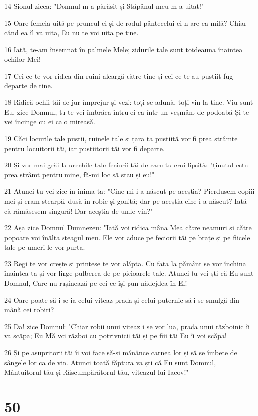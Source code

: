 \par 14 Sionul zicea: "Domnul m-a părăsit și Stăpânul meu m-a uitat!"
\par 15 Oare femeia uită pe pruncul ei și de rodul pântecelui ei n-are ea milă? Chiar când ea îl va uita, Eu nu te voi uita pe tine.
\par 16 Iată, te-am însemnat în palmele Mele; zidurile tale sunt totdeauna înaintea ochilor Mei!
\par 17 Cei ce te vor ridica din ruini aleargă către tine și cei ce te-au pustiit fug departe de tine.
\par 18 Ridică ochii tăi de jur împrejur și vezi: toți se adună, toți vin la tine. Viu sunt Eu, zice Domnul, tu te vei îmbrăca întru ei ca într-un veșmânt de podoabă Și te vei încinge cu ei ca o mireasă.
\par 19 Căci locurile tale pustii, ruinele tale și țara ta pustiită vor fi prea strâmte pentru locuitorii tăi, iar pustiitorii tăi vor fi departe.
\par 20 Și vor mai grăi la urechile tale feciorii tăi de care tu erai lipsită: "ținutul este prea strâmt pentru mine, fă-mi loc să stau și eu!"
\par 21 Atunci tu vei zice în inima ta: "Cine mi i-a născut pe aceștia? Pierdusem copiii mei și eram stearpă, dusă în robie și gonită; dar pe aceștia cine i-a născut? Iată că rămăsesem singură! Dar aceștia de unde vin?"
\par 22 Așa zice Domnul Dumnezeu: "Iată voi ridica mâna Mea către neamuri și către popoare voi înălța steagul meu. Ele vor aduce pe feciorii tăi pe brațe și pe fiicele tale pe umeri le vor purta.
\par 23 Regi te vor crește și prințese te vor alăpta. Cu fața la pământ se vor închina înaintea ta și vor linge pulberea de pe picioarele tale. Atunci tu vei ști că Eu sunt Domnul, Care nu rușinează pe cei ce își pun nădejdea în El!
\par 24 Oare poate să i se ia celui viteaz prada și celui puternic să i se smulgă din mână cei robiri?
\par 25 Da! zice Domnul: "Chiar robii unui viteaz i se vor lua, prada unui războinic îi va scăpa; Eu Mă voi război cu potrivnicii tăi și pe fiii tăi Eu îi voi scăpa!
\par 26 Și pe asupritorii tăi îi voi face să-și mănânce carnea lor și să se îmbete de sângele lor ca de vin. Atunci toată făptura va ști că Eu sunt Domnul, Mântuitorul tău și Răscumpărătorul tău, viteazul lui Iacov!"

\chapter{50}

